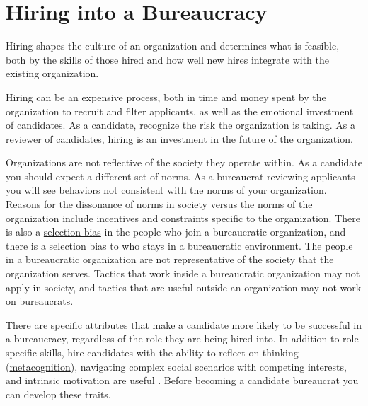 



\section{Hiring into a Bureaucracy\label{sec:hiring}}


Hiring shapes the culture of an organization and determines what is feasible, both by the skills of those hired and how well new hires integrate with the existing organization. 

Hiring can be an expensive process, both in time and money spent by the organization to recruit and filter applicants, as well as the emotional investment of candidates. %
As a candidate, recognize the risk the organization is taking. 
As a reviewer of candidates, hiring is an investment in the future of the organization. %

Organizations are not reflective of the society they operate within. As a candidate you should expect a different set of norms. As a bureaucrat reviewing applicants you will see behaviors not consistent with the norms of your organization. 
Reasons for the dissonance of norms in society versus the norms of the organization include incentives and constraints specific to the organization. 
There is also a \href{https://en.wikipedia.org/wiki/Selection_bias}{selection bias} in
the people who join a bureaucratic organization, and there is a selection bias to who stays in a bureaucratic environment. 
The people in a bureaucratic organization are not representative of the society that the organization serves. Tactics that work inside a bureaucratic organization may not apply in society, and tactics that are useful outside an organization may not work on bureaucrats. 



There are specific attributes that make a candidate more likely to be successful in a bureaucracy, regardless of the role they are being hired into. 
In addition to role-specific skills, hire candidates with the ability to reflect on 
thinking (\href{https://en.wikipedia.org/wiki/Metacognition}{metacognition}),
\iftoggle{WPinmargin}{\marginpar{$>$Wikipedia: Metacognition}}{}
navigating complex social scenarios with competing interests, and intrinsic motivation are useful . Before becoming a candidate bureaucrat you can develop these traits. 




